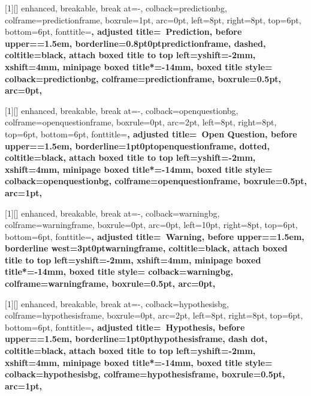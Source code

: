 [1][]{%
  enhanced,
  breakable,
  break at=-\baselineskip,
  colback=predictionbg,
  colframe=predictionframe,
  boxrule=1pt,
  arc=0pt,
  left=8pt,
  right=8pt,
  top=6pt,
  bottom=6pt,
  fonttitle=\bfseries\sffamily,
  adjusted title={\predictionicon~Prediction},
  before upper={\parindent=1.5em},
  borderline={0.8pt}{0pt}{predictionframe, dashed},
  coltitle=black,
  attach boxed title to top left={yshift=-2mm, xshift=4mm},
  minipage boxed title*=-14mm,
  boxed title style={
    colback=predictionbg,
    colframe=predictionframe,
    boxrule=0.5pt,
    arc=0pt,
      }
}

[1][]{%
  enhanced,
  breakable,
  break at=-\baselineskip,
  colback=openquestionbg,
  colframe=openquestionframe,
  boxrule=0pt,
  arc=2pt,
  left=8pt,
  right=8pt,
  top=6pt,
  bottom=6pt,
  fonttitle=\bfseries\sffamily,
  adjusted title={\openquestionicon~Open Question},
  before upper={\parindent=1.5em},
  borderline={1pt}{0pt}{openquestionframe, dotted},
  coltitle=black,
  attach boxed title to top left={yshift=-2mm, xshift=4mm},
  minipage boxed title*=-14mm,
  boxed title style={
    colback=openquestionbg,
    colframe=openquestionframe,
    boxrule=0.5pt,
    arc=1pt,
      }
}

[1][]{%
  enhanced,
  breakable,
  break at=-\baselineskip,
  colback=warningbg,
  colframe=warningframe,
  boxrule=0pt,
  arc=0pt,
  left=10pt,
  right=8pt,
  top=6pt,
  bottom=6pt,
  fonttitle=\bfseries\sffamily,
  adjusted title={\warningicon~Warning},
  before upper={\parindent=1.5em},
  borderline west={3pt}{0pt}{warningframe},
  coltitle=black,
  attach boxed title to top left={yshift=-2mm, xshift=4mm},
  minipage boxed title*=-14mm,
  boxed title style={
    colback=warningbg,
    colframe=warningframe,
    boxrule=0.5pt,
    arc=0pt,
      }
}

[1][]{%
  enhanced,
  breakable,
  break at=-\baselineskip,
  colback=hypothesisbg,
  colframe=hypothesisframe,
  boxrule=0pt,
  arc=2pt,
  left=8pt,
  right=8pt,
  top=6pt,
  bottom=6pt,
  fonttitle=\bfseries\sffamily,
  adjusted title={\hypothesisicon~Hypothesis},
  before upper={\parindent=1.5em},
  borderline={1pt}{0pt}{hypothesisframe, dash dot},
  coltitle=black,
  attach boxed title to top left={yshift=-2mm, xshift=4mm},
  minipage boxed title*=-14mm,
  boxed title style={
    colback=hypothesisbg,
    colframe=hypothesisframe,
    boxrule=0.5pt,
    arc=1pt,
      }
}

